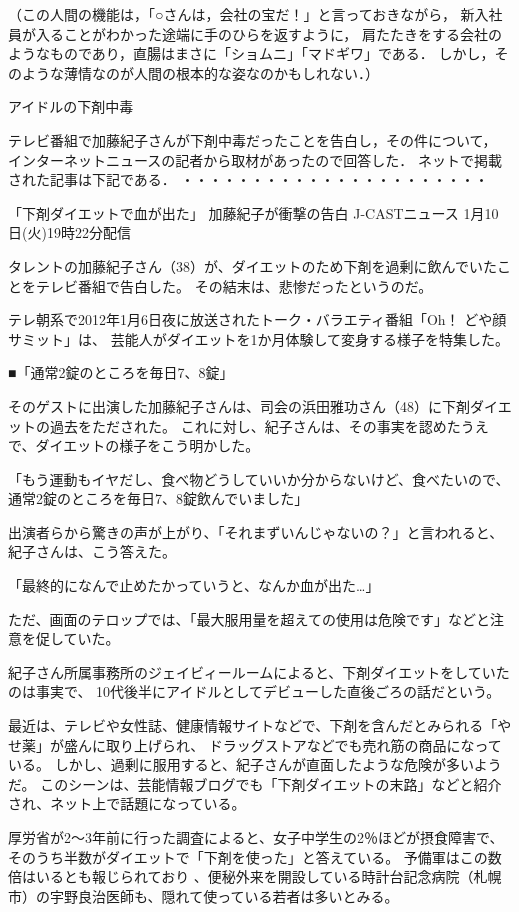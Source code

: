 （この人間の機能は，「○さんは，会社の宝だ！」と言っておきながら，
新入社員が入ることがわかった途端に手のひらを返すように，
肩たたきをする会社のようなものであり，直腸はまさに「ショムニ」「マドギワ」である．
しかし，そのような薄情なのが人間の根本的な姿なのかもしれない．）

アイドルの下剤中毒

テレビ番組で加藤紀子さんが下剤中毒だったことを告白し，その件について，
インターネットニュースの記者から取材があったので回答した．
ネットで掲載された記事は下記である．
・・・・・・・・・・・・・・・・・・・・・・

「下剤ダイエットで血が出た」 加藤紀子が衝撃の告白
J-CASTニュース 1月10日(火)19時22分配信

タレントの加藤紀子さん（38）が、ダイエットのため下剤を過剰に飲んでいたことをテレビ番組で告白した。
その結末は、悲惨だったというのだ。 

テレ朝系で2012年1月6日夜に放送されたトーク・バラエティ番組「Oh！ どや顔サミット」は、
芸能人がダイエットを1か月体験して変身する様子を特集した。

■「通常2錠のところを毎日7、8錠」 

そのゲストに出演した加藤紀子さんは、司会の浜田雅功さん（48）に下剤ダイエットの過去をただされた。
これに対し、紀子さんは、その事実を認めたうえで、ダイエットの様子をこう明かした。 

「もう運動もイヤだし、食べ物どうしていいか分からないけど、食べたいので、
通常2錠のところを毎日7、8錠飲んでいました」 

出演者らから驚きの声が上がり、「それまずいんじゃないの？」と言われると、紀子さんは、こう答えた。 

「最終的になんで止めたかっていうと、なんか血が出た…」 

ただ、画面のテロップでは、「最大服用量を超えての使用は危険です」などと注意を促していた。 

紀子さん所属事務所のジェイビィールームによると、下剤ダイエットをしていたのは事実で、
10代後半にアイドルとしてデビューした直後ごろの話だという。 

最近は、テレビや女性誌、健康情報サイトなどで、下剤を含んだとみられる「やせ薬」が盛んに取り上げられ、
ドラッグストアなどでも売れ筋の商品になっている。
しかし、過剰に服用すると、紀子さんが直面したような危険が多いようだ。
このシーンは、芸能情報ブログでも「下剤ダイエットの末路」などと紹介され、ネット上で話題になっている。 

厚労省が2～3年前に行った調査によると、女子中学生の2％ほどが摂食障害で、
そのうち半数がダイエットで「下剤を使った」と答えている。
予備軍はこの数倍はいるとも報じられており
、便秘外来を開設している時計台記念病院（札幌市）の宇野良治医師も、隠れて使っている若者は多いとみる。


